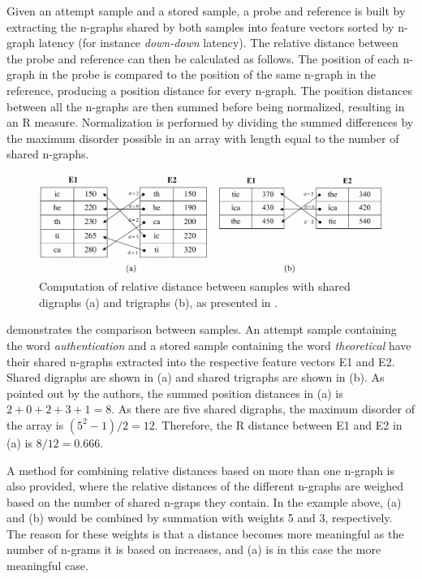 \documentclass[informationsecurity]{gucmasterproject}
\begin{document}
Given an attempt sample and a stored sample, a probe and reference is built by extracting the n-graphs shared by both samples into feature vectors sorted by n-graph latency (for instance \textit{down-down} latency).
The relative distance between the probe and reference can then be calculated as follows.
The position of each n-graph in the probe is compared to the position of the same n-graph in the reference, producing a position distance for every n-graph.
The position distances between all the n-graphs are then summed before being normalized, resulting in an R measure.
Normalization is performed by dividing the summed differences by the maximum disorder possible in an array with length equal to the number of shared n-graphs.

\begin{figure}[h]
    \centering
    \includegraphics[width=1\textwidth]{gunetti/R-measure}
    \caption{Computation of relative distance between samples with shared digraphs (a) and trigraphs (b), as presented in \cite{gnp}.}
    \label{fig:R-measure}
\end{figure}

 demonstrates the comparison between samples.
An attempt sample containing the word \textit{authentication} and a stored sample containing the word \textit{theoretical} have their shared n-graphs extracted into the respective feature vectors E1 and E2.
Shared digraphs are shown in (a) and shared trigraphs are shown in (b). 
As pointed out by the authors, the summed position distances in (a) is $2+0+2+3+1=8$.
As there are five shared digraphs, the maximum disorder of the array is $(5^2-1)/2=12$.
Therefore, the R distance between E1 and E2 in (a) is $8/12 = 0.666$.

A method for combining relative distances based on more than one n-graph is also provided, where the relative distances of the different n-graphs are weighed based on the number of shared n-graps they contain. 
In the example above, (a) and (b) would be combined by summation with weights 5 and 3, respectively.
The reason for these weights is that a distance becomes more meaningful as the number of n-grams it is based on increases, and (a) is in this case the more meaningful case.
\end{document}
